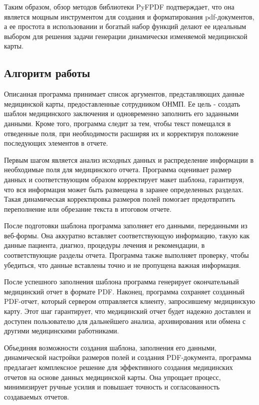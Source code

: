 Таким образом, обзор методов библиотеки PyFPDF подтверждает, что она является мощным инструментом для создания и форматирования pdf-документов, а ее простота в использовании и богатый набор функций делают ее идеальным выбором для решения задачи генерации динамически изменяемой медицинской карты.

\subsection{Алгоритм работы}
Описанная программа принимает список аргументов, представляющих данные медицинской карты, предоставленные сотрудником ОНМП. Ее цель - создать шаблон медицинского заключения и одновременно заполнить его заданными данными. Кроме того, программа следит за тем, чтобы текст помещался в отведенные поля, при необходимости расширяя их и корректируя положение последующих элементов в отчете.

Первым шагом является анализ исходных данных и распределение информации в необходимые поля для медицинского отчета. Программа оценивает размер данных и соответствующим образом корректирует макет шаблона, гарантируя, что вся информация может быть размещена в заранее определенных разделах. Такая динамическая корректировка размеров полей помогает предотвратить переполнение или обрезание текста в итоговом отчете.

После подготовки шаблона программа заполняет его данными, переданными из веб-формы. Она аккуратно вставляет соответствующую информацию, такую как данные пациента, диагноз, процедуры лечения и рекомендации, в соответствующие разделы отчета. Программа также выполняет проверку, чтобы убедиться, что данные вставлены точно и не пропущена важная информация.

После успешного заполнения шаблона программа генерирует окончательный медицинский отчет в формате PDF. Наконец, программа сохраняет созданный PDF-отчет, который сервером отправляется клиенту, запросившему медицинскую карту. Этот шаг гарантирует, что медицинский отчет будет надежно доставлен и доступен пользователю для дальнейшего анализа, архивирования или обмена с другими медицинскими работниками.

Объединяя возможности создания шаблона, заполнения его данными, динамической настройки размеров полей и создания PDF-документа, программа предлагает комплексное решение для эффективного создания медицинских отчетов на основе данных медицинской карты. Она упрощает процесс, минимизирует ручные усилия и повышает точность и согласованность создаваемых отчетов.


